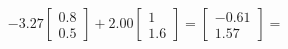 \documentclass[preview]{standalone}
\begin{document}
\begin{align*}
-3.27 \begin{bmatrix} 0.8 \\ 0.5 \end{bmatrix} + 2.00 \begin{bmatrix} 1 \\ 1.6 \end{bmatrix} = \begin{bmatrix} -0.61 \\ 1.57 \end{bmatrix} =
\end{align*}
\end{document}
